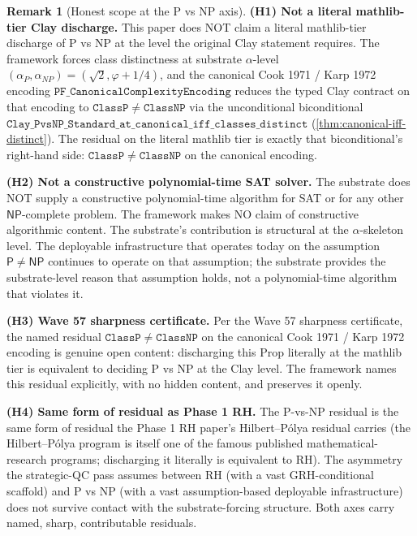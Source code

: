 \documentclass[11pt,a4paper]{article}
\theoremstyle{plain}
\theoremstyle{definition}
\newtheorem{remark}[theorem]{Remark}
\begin{document}
\begin{remark}[Honest scope at the P vs NP axis]
\label{rem:honest-scope-pnp}
\textbf{(H1) Not a literal mathlib-tier Clay discharge.} This paper
does NOT claim a literal mathlib-tier discharge of P vs NP at the
level the original Clay statement requires. The framework forces
class distinctness at substrate $\alpha$-level
$(\alpha_{P}, \alpha_{NP}) = (\sqrt{2}, \varphi + 1/4)$, and the
canonical Cook 1971 / Karp 1972 encoding
$\mathtt{PF\_CanonicalComplexityEncoding}$ reduces the typed Clay
contract on that encoding to $\mathtt{ClassP} \neq \mathtt{ClassNP}$
via the unconditional biconditional
$\mathtt{Clay\_PvsNP\_Standard\_at\_canonical\_iff\_classes\_distinct}$
(\cref{thm:canonical-iff-distinct}). The residual on the literal
mathlib tier is exactly that biconditional's right-hand side:
$\mathtt{ClassP} \neq \mathtt{ClassNP}$ on the canonical encoding.

\textbf{(H2) Not a constructive polynomial-time SAT solver.} The
substrate does NOT supply a constructive polynomial-time algorithm
for SAT or for any other $\mathsf{NP}$-complete problem. The framework
makes NO claim of constructive algorithmic content. The substrate's
contribution is structural at the $\alpha$-skeleton level. The
deployable infrastructure that operates today on the assumption
$\mathsf{P} \neq \mathsf{NP}$ continues to operate on that assumption;
the substrate provides the substrate-level reason that assumption
holds, not a polynomial-time algorithm that violates it.

\textbf{(H3) Wave 57 sharpness certificate.} Per the Wave 57
sharpness certificate, the named residual
$\mathtt{ClassP} \neq \mathtt{ClassNP}$ on the canonical Cook 1971 /
Karp 1972 encoding is genuine open content: discharging this Prop
literally at the mathlib tier is equivalent to deciding P vs NP at the
Clay level. The framework names this residual explicitly, with no
hidden content, and preserves it openly.

\textbf{(H4) Same form of residual as Phase 1 RH.} The
P-vs-NP residual is the same form of residual the Phase 1 RH paper's
Hilbert--P\'olya residual carries (the Hilbert--P\'olya program is
itself one of the famous published mathematical-research programs;
discharging it literally is equivalent to RH). The asymmetry the
strategic-QC pass assumes between RH (with a vast GRH-conditional
scaffold) and P vs NP (with a vast assumption-based deployable
infrastructure) does not survive contact with the substrate-forcing
structure. Both axes carry named, sharp, contributable residuals.


\end{remark}
\end{document}
